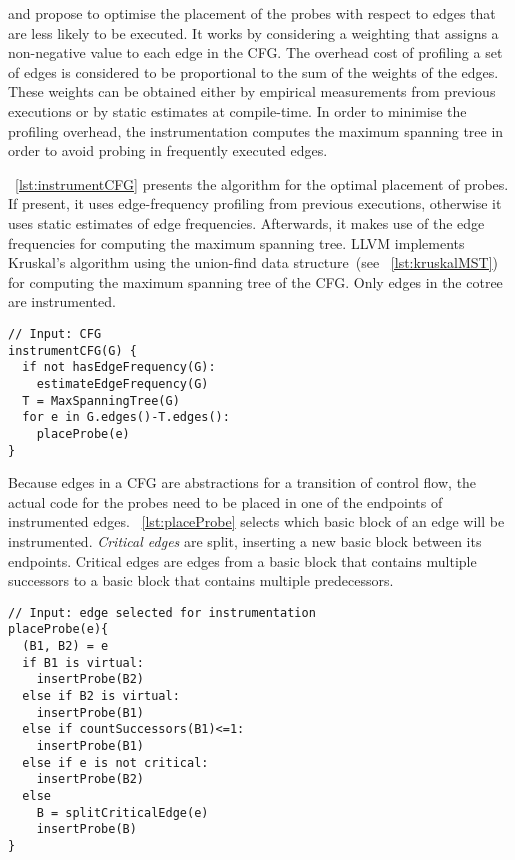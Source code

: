 \cite{forman81} and \cite{ball94} propose to optimise the placement of the probes with respect to edges that are less likely to be executed.
It works by considering a weighting that assigns a non-negative value to each edge in the CFG.
The overhead cost of profiling a set of edges is considered to be proportional to the sum of the weights of the edges.
These weights can be obtained either by empirical measurements from previous executions or by static estimates at compile-time.
In order to minimise the profiling overhead, the instrumentation computes the maximum spanning tree in order to avoid probing in frequently executed edges.

\lstlistingname~\ref{lst:instrumentCFG} presents the algorithm for the optimal placement of probes.
If present, it uses edge-frequency profiling from previous executions,
otherwise it uses static estimates of edge frequencies.
Afterwards, it makes use of the edge frequencies for computing the maximum spanning tree.
LLVM implements Kruskal's algorithm using the union-find data structure~(see \lstlistingname~\ref{lst:kruskalMST})
for computing the maximum spanning tree of the CFG.
Only edges in the cotree are instrumented.

\begin{lstlisting}[caption={Optimal placement of probes for block frequency.}, label={lst:instrumentCFG}]
// Input: CFG	
instrumentCFG(G) {
  if not hasEdgeFrequency(G):
    estimateEdgeFrequency(G)
  T = MaxSpanningTree(G)
  for e in G.edges()-T.edges():
    placeProbe(e)
}
\end{lstlisting}

Because edges in a CFG are abstractions for a transition of control flow,
the actual code for the probes need to be placed in one of the endpoints of instrumented edges.
\lstlistingname~\ref{lst:placeProbe} selects which basic block of an edge will be instrumented.
\textit{Critical edges} are split, inserting a new basic block between its endpoints.
Critical edges are edges from a basic block that contains multiple successors to a basic block that contains multiple predecessors.

\begin{lstlisting}[caption={For a given edge, this procedure selects which basic block to place the instrumented code.
                            If the edge is critical, an intermediate basic block is created for the instrumentation.}, label={lst:placeProbe}]
// Input: edge selected for instrumentation
placeProbe(e){
  (B1, B2) = e
  if B1 is virtual:
    insertProbe(B2)
  else if B2 is virtual:
    insertProbe(B1)
  else if countSuccessors(B1)<=1:
    insertProbe(B1)
  else if e is not critical:
    insertProbe(B2)
  else
    B = splitCriticalEdge(e)
    insertProbe(B)
}
\end{lstlisting}


